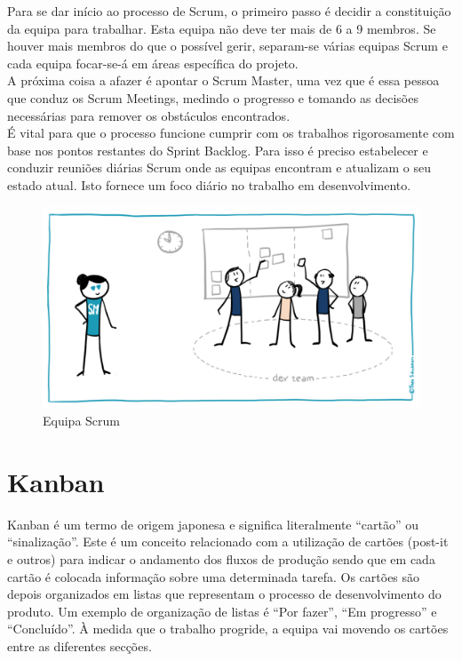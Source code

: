 Para se dar início ao processo de Scrum, o primeiro passo é decidir a constituição da equipa para trabalhar. Esta equipa não deve ter mais de 6 a 9 membros. Se houver mais membros do que o possível gerir, separam-se várias equipas Scrum e cada equipa focar-se-á em áreas específica do projeto.
\\
A próxima coisa a afazer é apontar o Scrum Master, uma vez que é essa pessoa que conduz os Scrum Meetings, medindo o progresso e tomando as decisões necessárias para remover os obstáculos encontrados.
\\
É vital para que o processo funcione cumprir com os trabalhos rigorosamente com base nos pontos restantes do Sprint Backlog. Para isso é preciso estabelecer e conduzir reuniões diárias Scrum onde as equipas encontram e atualizam o seu estado atual. Isto fornece um foco diário no trabalho em desenvolvimento.

\begin{figure}[H]
    \centering
    \includegraphics[scale=0.4]{Imagens/team.png}
    \caption{Equipa Scrum}
    \label{fig:equipascrum}
\end{figure}

\newpage

\section{Kanban}

Kanban é um termo de origem japonesa e significa literalmente “cartão” ou “sinalização”. Este é um conceito relacionado com a utilização de cartões (post-it e outros) para indicar o andamento dos fluxos de produção sendo que em cada cartão é colocada informação sobre uma determinada tarefa. Os cartões são depois organizados em listas que representam o processo de desenvolvimento do produto. Um exemplo de organização de listas é “Por fazer”, “Em progresso” e “Concluído”. À medida que o trabalho progride, a equipa vai movendo os cartões entre as diferentes secções.

